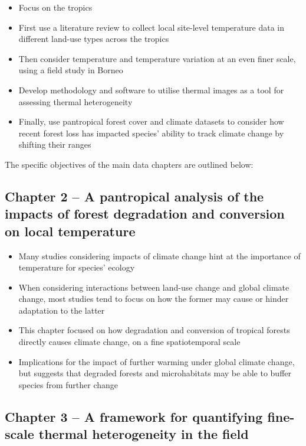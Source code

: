 \documentclass[12pt,a4paper,]{report}
\providecommand{\tightlist}{%
  \setlength{\itemsep}{0pt}\setlength{\parskip}{0pt}}
\theoremstyle{definition}
\theoremstyle{definition}
\theoremstyle{definition}
\theoremstyle{remark}
\begin{document}
\begin{itemize}
\tightlist
\item
  Focus on the tropics
\item
  First use a literature review to collect local site-level temperature
  data in different land-use types across the tropics
\item
  Then consider temperature and temperature variation at an even finer
  scale, using a field study in Borneo
\item
  Develop methodology and software to utilise thermal images as a tool
  for assessing thermal heterogeneity
\item
  Finally, use pantropical forest cover and climate datasets to consider
  how recent forest loss has impacted species' ability to track climate
  change by shifting their ranges
\end{itemize}

The specific objectives of the main data chapters are outlined below:

\subsection{Chapter 2 -- A pantropical analysis of the impacts of forest
degradation and conversion on local
temperature}\label{chapter-2-a-pantropical-analysis-of-the-impacts-of-forest-degradation-and-conversion-on-local-temperature}

\begin{itemize}
\tightlist
\item
  Many studies considering impacts of climate change hint at the
  importance of temperature for species' ecology
\item
  When considering interactions between land-use change and global
  climate change, most studies tend to focus on how the former may cause
  or hinder adaptation to the latter
\item
  This chapter focused on how degradation and conversion of tropical
  forests directly causes climate change, on a fine spatiotemporal scale
\item
  Implications for the impact of further warming under global climate
  change, but suggests that degraded forests and microhabitats may be
  able to buffer species from further change
\end{itemize}

\subsection{Chapter 3 -- A framework for quantifying fine-scale thermal
heterogeneity in the
field}\label{chapter-3-a-framework-for-quantifying-fine-scale-thermal-heterogeneity-in-the-field}
\end{document}
